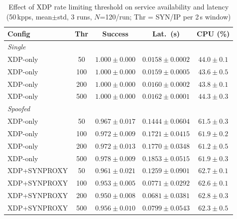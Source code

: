 \begin{table}[h]
\centering
\caption{Effect of XDP rate limiting threshold on service
availability and latency (50\,kpps, mean$\pm$std, 3 runs,
$N$=120/run; Thr = SYN/IP per 2\,s window)}
\label{tab:threshold}
\footnotesize
\setlength{\tabcolsep}{3pt}
\begin{tabular}{|l|c|c|c|c|}
\hline
\textbf{Config} & \textbf{Thr} & \textbf{Success} & \textbf{Lat.\ (s)} & \textbf{CPU (\%)} \\
\hline
\multicolumn{5}{|l|}{\textit{Single}} \\
\hline
XDP-only & 50 & $1.000{\pm}0.000$ & $0.0158{\pm}0.0002$ & $44.0{\pm}0.1$ \\
XDP-only & 100 & $1.000{\pm}0.000$ & $0.0159{\pm}0.0005$ & $43.6{\pm}0.5$ \\
XDP-only & 200 & $1.000{\pm}0.000$ & $0.0160{\pm}0.0002$ & $43.8{\pm}0.1$ \\
XDP-only & 500 & $1.000{\pm}0.000$ & $0.0162{\pm}0.0001$ & $44.3{\pm}0.3$ \\
\hline
\multicolumn{5}{|l|}{\textit{Spoofed}} \\
\hline
XDP-only & 50 & $0.967{\pm}0.017$ & $0.1444{\pm}0.0604$ & $61.5{\pm}0.3$ \\
XDP-only & 100 & $0.972{\pm}0.009$ & $0.1721{\pm}0.0415$ & $61.9{\pm}0.2$ \\
XDP-only & 200 & $0.972{\pm}0.013$ & $0.1770{\pm}0.0348$ & $61.2{\pm}0.5$ \\
XDP-only & 500 & $0.978{\pm}0.009$ & $0.1853{\pm}0.0515$ & $61.9{\pm}0.3$ \\
XDP+SYNPROXY & 50 & $0.961{\pm}0.021$ & $0.1259{\pm}0.0901$ & $62.7{\pm}0.1$ \\
XDP+SYNPROXY & 100 & $0.953{\pm}0.005$ & $0.0771{\pm}0.0292$ & $62.6{\pm}0.1$ \\
XDP+SYNPROXY & 200 & $0.950{\pm}0.008$ & $0.0681{\pm}0.0381$ & $62.8{\pm}0.3$ \\
XDP+SYNPROXY & 500 & $0.956{\pm}0.010$ & $0.0799{\pm}0.0543$ & $62.3{\pm}0.5$ \\
\hline
\end{tabular}
\end{table}